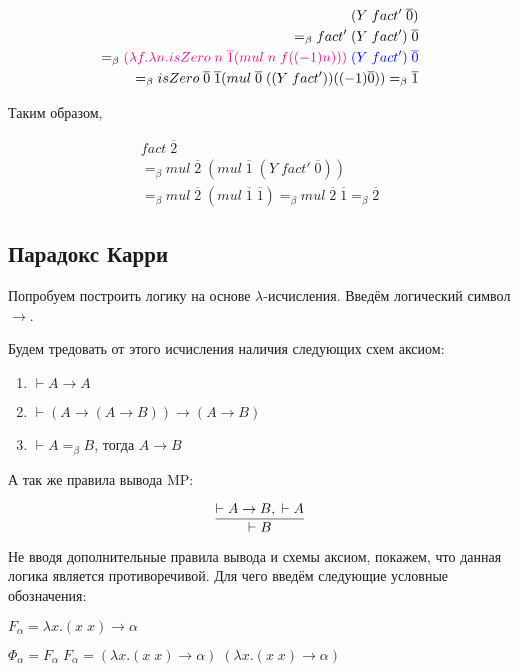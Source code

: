\begin{align*}
	(Y \; fact' \; \overline{0}) \\ =_{\beta} fact' \; (Y \; fact') \; \overline{0} \\ =_{\beta} \textcolor{magenta}{(\lambda f. \lambda n. isZero\; n \; \overline{1} (mul \; n \; f((-1) n)))} \; \textcolor{blue}{(Y \; fact') \; \overline{0}} \\ =_{\beta}  isZero\; \overline{0} \; \overline{1} (mul \; \overline{0} \; ((Y \; fact'))((-1) \overline{0})) =_{\beta} \overline{1}
\end{align*}

Таким образом,

\begin{align*}
	fact \; \overline{2} \\ =_{\beta} mul \; \overline{2} \; (mul \; \overline{1} \; (Y \; fact' \; \overline{0})) \\=_{\beta} mul \; \overline{2} \; (mul \; \overline{1} \; \overline{1}) =_{\beta} mul \; \overline{2} \; \overline{1} =_{\beta} \overline{2}
\end{align*}

\subsection{Парадокс Карри}

Попробуем построить логику на основе $\lambda$-исчисления. Введём логический символ $\rightarrow$. 

Будем тредовать от этого исчисления наличия следующих схем аксиом:

\begin{enumerate}
	\item $\vdash A \rightarrow A$
	\item $\vdash (A \rightarrow (A \rightarrow B)) \rightarrow (A \rightarrow B)$
	\item $\vdash A =_{\beta} B$, тогда $A \rightarrow B$
\end{enumerate}

А так же правила вывода MP:

$$\infer{\vdash B}{\vdash A \rightarrow B, \; \vdash A}$$

Не вводя дополнительные правила вывода и схемы аксиом, покажем, что данная логика является противоречивой. Для чего введём следующие условные обозначения:

$F_{\alpha} = \lambda x. (x \; x) \rightarrow \alpha$

$\Phi_{\alpha} = F_{\alpha}  \; F_{\alpha}  = (\lambda x. (x \; x) \rightarrow \alpha) \; (\lambda x. (x \; x) \rightarrow \alpha)$

